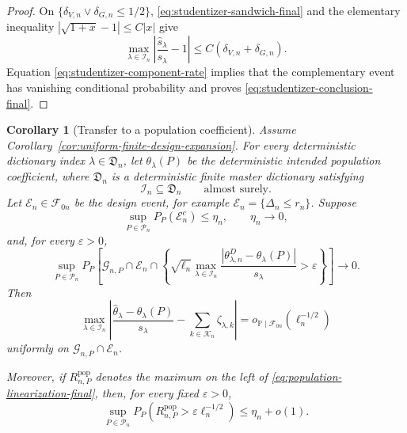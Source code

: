 \documentclass[11pt]{article}
\newtheorem{corollary}[theorem]{Corollary}
\theoremstyle{definition}
\newcommand{\1}{\mathbf 1}\newcommand{\op}{\operatorname}
\begin{document}
\begin{proof}
On $\{\delta_{V,n}\vee\delta_{G,n}\le1/2\}$,
\eqref{eq:studentizer-sandwich-final} and the elementary inequality
$|\sqrt{1+x}-1|\le C|x|$ give
\[
\max_{\lambda\in\mathcal I_n}
\left|
\frac{\widehat s_\lambda}{s_\lambda}-1
\right|
\le
C(\delta_{V,n}+\delta_{G,n}).
\]
Equation \eqref{eq:studentizer-component-rate} implies that the
complementary event has vanishing conditional probability and proves
\eqref{eq:studentizer-conclusion-final}.
\end{proof}

\begin{corollary}[Transfer to a population coefficient]
\label{cor:population-transfer-final}
Assume Corollary~\ref{cor:uniform-finite-design-expansion}. For every
deterministic dictionary index $\lambda\in\mathfrak D_n$, let
$\theta_\lambda(P)$ be the deterministic intended population
coefficient, where $\mathfrak D_n$ is a deterministic finite master
dictionary satisfying
\[
\mathcal I_n\subseteq\mathfrak D_n
\qquad\text{almost surely}.
\]
Let
$\mathcal E_n\in\mathcal F_{0n}$ be the design event, for example
$\mathcal E_n=\{\Delta_n\le r_n\}$. Suppose
\begin{equation}
\sup_{P\in\mathcal P_n}P_P(\mathcal E_n^c)
\le\eta_n,
\qquad
\eta_n\longrightarrow0,
\label{eq:design-event-final}
\end{equation}
and, for every $\varepsilon>0$,
\begin{equation}
\sup_{P\in\mathcal P_n}
P_P\!\left[
\mathcal G_{n,P}\cap\mathcal E_n\cap
\left\{
\sqrt{\ell_n}
\max_{\lambda\in\mathcal I_n}
\frac{|\theta_{\lambda,n}^D-\theta_\lambda(P)|}{s_\lambda}
>\varepsilon
\right\}
\right]
\longrightarrow0.
\label{eq:population-bias-rate-final}
\end{equation}
Then
\begin{equation}
\max_{\lambda\in\mathcal I_n}
\left|
\frac{\widehat\theta_\lambda-\theta_\lambda(P)}{s_\lambda}
-
\sum_{k\in\mathcal K_n}\zeta_{\lambda,k}
\right|
=
o_{\mathbb P\mid\mathcal F_{0n}}(\ell_n^{-1/2})
\label{eq:population-linearization-final}
\end{equation}
uniformly on $\mathcal G_{n,P}\cap\mathcal E_n$.

Moreover, if $R_{n,P}^{\mathrm{pop}}$ denotes the maximum on the
left of \eqref{eq:population-linearization-final}, then, for every
fixed $\varepsilon>0$,
\begin{equation}
\sup_{P\in\mathcal P_n}
P_P\!\left(
R_{n,P}^{\mathrm{pop}}
>
\varepsilon\ell_n^{-1/2}
\right)
\le
\eta_n+o(1).
\label{eq:unconditional-population-bound-final}
\end{equation}
\end{corollary}
\end{document}
